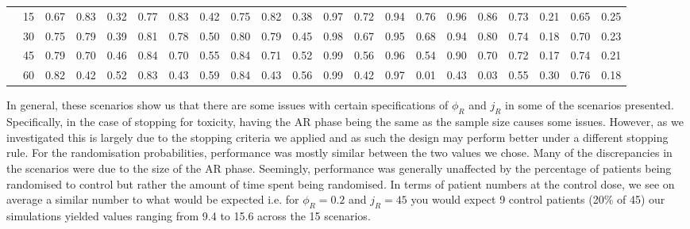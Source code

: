\begin{table}[h!]
{\begin{tabular}[t]{ccccccccccccccccccccc}
			\hspace{1em} & 15 & 0.67 & 0.83 & 0.32 & 0.77 & 0.83 & 0.42 & 0.75 & 0.82 & 0.38 & 0.97 & 0.72 & 0.94 & 0.76 & 0.96 & 0.86 & 0.73 & 0.21 & 0.65 & 0.25\\
			
			\hspace{1em} & 30 & 0.75 & 0.79 & 0.39 & 0.81 & 0.78 & 0.50 & 0.80 & 0.79 & 0.45 & 0.98 & 0.67 & 0.95 & 0.68 & 0.94 & 0.80 & 0.74 & 0.18 & 0.70 & 0.23\\
			
			\hspace{1em} & 45 & 0.79 & 0.70 & 0.46 & 0.84 & 0.70 & 0.55 & 0.84 & 0.71 & 0.52 & 0.99 & 0.56 & 0.96 & 0.54 & 0.90 & 0.70 & 0.72 & 0.17 & 0.74 & 0.21\\
			
			\hspace{1em}\multirow{-5}{*}{\centering\arraybackslash 0.33} & 60 & 0.82 & 0.42 & 0.52 & 0.83 & 0.43 & 0.59 & 0.84 & 0.43 & 0.56 & 0.99 & 0.42 & 0.97 & 0.01 & 0.43 & 0.03 & 0.55 & 0.30 & 0.76 & 0.18\\
			\bottomrule
	\end{tabular}}
\end{table}

In general, these scenarios show us that there are some issues with certain specifications of $\phi_R$ and $j_R$ in some of the scenarios presented. Specifically, in the case of stopping for toxicity, having the AR phase being the same as the sample size causes some issues. However, as we investigated this is largely due to the stopping criteria we applied and as such the design may perform better under a different stopping rule. For the randomisation probabilities, performance was mostly similar between the two values we chose. Many of the discrepancies in the scenarios were due to the size of the AR phase. Seemingly, performance was generally unaffected by the percentage of patients being randomised to control but rather the amount of time spent being randomised. In terms of patient numbers at the control dose, we see on average a similar number to what would be expected i.e. for $\phi_R = 0.2$ and  $j_R = 45$ you would expect 9 control patients (20\% of 45) our simulations yielded values ranging from 9.4 to 15.6 across the 15 scenarios. 

